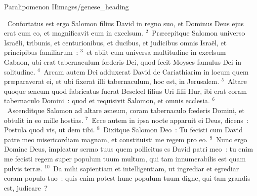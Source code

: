 {Paralipomenon II}{images/genese_heading}

~\lettrine[lines=10,image=true,loversize=0.05,lraise=-0.03]{C}{}onfortatus est ergo Salomon filius David in regno suo, et Dominus Deus ejus erat cum eo, et magnificavit eum in excelsum.
${}^{2}$~Pr\ae cepitque Salomon universo Isra\"eli, tribunis, et centurionibus, et ducibus, et judicibus omnis Isra\"el, et principibus familiarum~:
${}^{3}$~et abiit cum universa multitudine in excelsum Gabaon, ubi erat tabernaculum fœderis Dei, quod fecit Moyses famulus Dei in solitudine.
${}^{4}$~Arcam autem Dei adduxerat David de Cariathiarim in locum quem pr\ae paraverat ei, et ubi fixerat illi tabernaculum, hoc est, in Jerusalem.
${}^{5}$~Altare quoque \ae neum quod fabricatus fuerat Beseleel filius Uri filii Hur, ibi erat coram tabernaculo Domini~: quod et requisivit Salomon, et omnis ecclesia.
${}^{6}$~Ascenditque Salomon ad altare \ae neum, coram tabernaculo fœderis Domini, et obtulit in eo mille hostias.
${}^{7}$~Ecce autem in ipsa nocte apparuit ei Deus, dicens~: Postula quod vis, ut dem tibi.
${}^{8}$~Dixitque Salomon Deo~: Tu fecisti cum David patre meo misericordiam magnam, et constituisti me regem pro eo.
${}^{9}$~Nunc ergo Domine Deus, impleatur sermo tuus quem pollicitus es David patri meo~: tu enim me fecisti regem super populum tuum multum, qui tam innumerabilis est quam pulvis terr\ae .
${}^{10}$~Da mihi sapientiam et intelligentiam, ut ingrediar et egrediar coram populo tuo~: quis enim potest hunc populum tuum digne, qui tam grandis est, judicare~?


